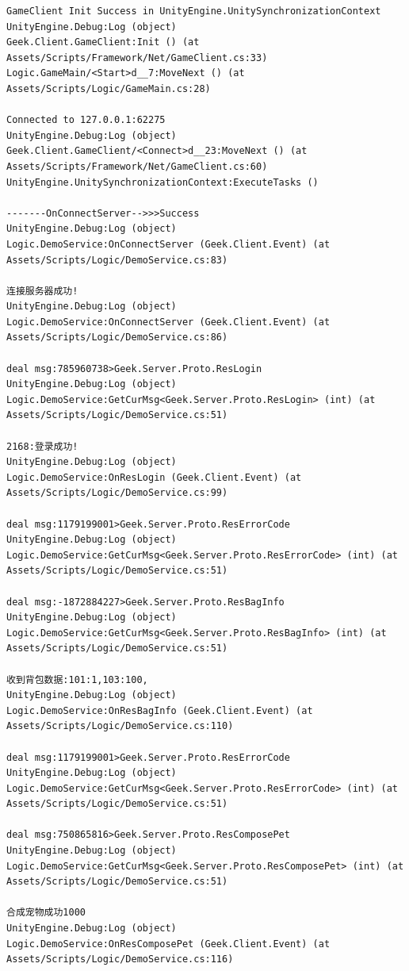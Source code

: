 \documentclass[9pt, b5paper]{article}
\begin{document}
\begin{verbatim}
GameClient Init Success in UnityEngine.UnitySynchronizationContext
UnityEngine.Debug:Log (object)
Geek.Client.GameClient:Init () (at Assets/Scripts/Framework/Net/GameClient.cs:33)
Logic.GameMain/<Start>d__7:MoveNext () (at Assets/Scripts/Logic/GameMain.cs:28)

Connected to 127.0.0.1:62275
UnityEngine.Debug:Log (object)
Geek.Client.GameClient/<Connect>d__23:MoveNext () (at Assets/Scripts/Framework/Net/GameClient.cs:60)
UnityEngine.UnitySynchronizationContext:ExecuteTasks ()

-------OnConnectServer-->>>Success
UnityEngine.Debug:Log (object)
Logic.DemoService:OnConnectServer (Geek.Client.Event) (at Assets/Scripts/Logic/DemoService.cs:83)

连接服务器成功!
UnityEngine.Debug:Log (object)
Logic.DemoService:OnConnectServer (Geek.Client.Event) (at Assets/Scripts/Logic/DemoService.cs:86)

deal msg:785960738>Geek.Server.Proto.ResLogin
UnityEngine.Debug:Log (object)
Logic.DemoService:GetCurMsg<Geek.Server.Proto.ResLogin> (int) (at Assets/Scripts/Logic/DemoService.cs:51)

2168:登录成功!
UnityEngine.Debug:Log (object)
Logic.DemoService:OnResLogin (Geek.Client.Event) (at Assets/Scripts/Logic/DemoService.cs:99)

deal msg:1179199001>Geek.Server.Proto.ResErrorCode
UnityEngine.Debug:Log (object)
Logic.DemoService:GetCurMsg<Geek.Server.Proto.ResErrorCode> (int) (at Assets/Scripts/Logic/DemoService.cs:51)

deal msg:-1872884227>Geek.Server.Proto.ResBagInfo
UnityEngine.Debug:Log (object)
Logic.DemoService:GetCurMsg<Geek.Server.Proto.ResBagInfo> (int) (at Assets/Scripts/Logic/DemoService.cs:51)

收到背包数据:101:1,103:100,
UnityEngine.Debug:Log (object)
Logic.DemoService:OnResBagInfo (Geek.Client.Event) (at Assets/Scripts/Logic/DemoService.cs:110)

deal msg:1179199001>Geek.Server.Proto.ResErrorCode
UnityEngine.Debug:Log (object)
Logic.DemoService:GetCurMsg<Geek.Server.Proto.ResErrorCode> (int) (at Assets/Scripts/Logic/DemoService.cs:51)

deal msg:750865816>Geek.Server.Proto.ResComposePet
UnityEngine.Debug:Log (object)
Logic.DemoService:GetCurMsg<Geek.Server.Proto.ResComposePet> (int) (at Assets/Scripts/Logic/DemoService.cs:51)

合成宠物成功1000
UnityEngine.Debug:Log (object)
Logic.DemoService:OnResComposePet (Geek.Client.Event) (at Assets/Scripts/Logic/DemoService.cs:116)


\end{verbatim}
\end{document}
